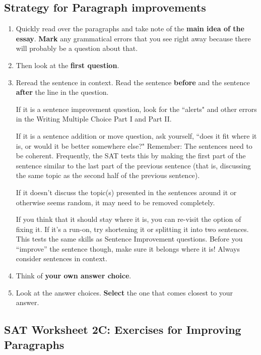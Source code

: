 \subsection{Strategy for Paragraph improvements}

\begin{enumerate}
\item Quickly read over the paragraphs and take note of the \textbf{main idea of the essay}. \textbf{Mark} any grammatical errors that you see right away because there will probably be a question about that.
\item Then look at the \textbf{first question}.  
\item Reread the sentence in context. Read the sentence \textbf{before} and the sentence \textbf{after} the line in the question. 

If it is a sentence improvement question, look for the ``alerts" and other errors in the Writing Multiple Choice Part I and Part II. 

If it is a sentence addition or move question, ask yourself, ``does it fit where it is, or would it be better somewhere else?" Remember: The sentences need to be coherent. Frequently, the SAT tests this by making the first part of the sentence similar to the last part of the previous sentence (that is, discussing the same topic as the second half of the previous sentence). 

If it doesn't discuss the topic(s) presented in the sentences around it or otherwise seems random, it may need to be removed completely. 

If you think that it should stay where it is, you can re-visit the option of fixing it.  If it's a run-on, try shortening it or splitting it into two sentences.  This tests the same skills as Sentence Improvement questions.  Before you “improve” the sentence though, make sure it belongs where it is!  Always consider sentences in context.

\item Think of \textbf{your own answer choice}.
\item Look at the answer choices.  \textbf{Select} the one that comes closest to your answer.
\end{enumerate}



\subsection{SAT Worksheet 2C: Exercises for Improving Paragraphs}

